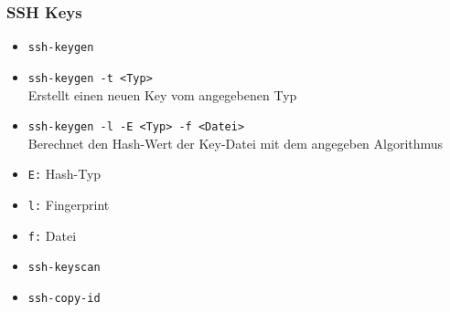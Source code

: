 \begin{frame}
\frametitle{SSH Keys}
\begin{itemize}
\item \texttt{ssh-keygen} 
\pause
\item \texttt{ssh-keygen -t <Typ>}\\ Erstellt einen neuen Key vom angegebenen Typ
\pause
\item \texttt{ssh-keygen -l -E <Typ> -f <Datei>}\\ Berechnet den Hash-Wert der Key-Datei mit dem angegeben Algorithmus
\pause
\item \texttt{E:} Hash-Typ
\pause
\item \texttt{l:} Fingerprint
\pause
\item \texttt{f:} Datei 
\pause
\item \texttt{ssh-keyscan}
\pause
\item \texttt{ssh-copy-id}
\end{itemize}
\end{frame}

